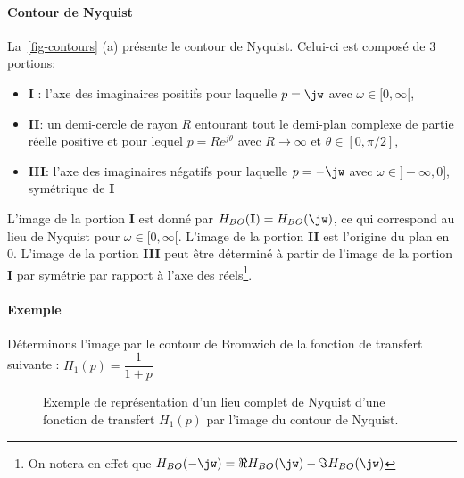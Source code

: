 \paragraph{Contour de Nyquist}
La~\cref{fig-contours} (a) présente le contour de Nyquist. Celui-ci est 
composé de 3 portions:
\begin{itemize}
    \item \textbf{I} : l'axe des imaginaires positifs pour laquelle $p=\jw$ 
          avec $\omega\in[0,\infty[$,
    \item \textbf{II}: un demi-cercle de rayon $R$ entourant tout le 
          demi-plan complexe de partie réelle positive et pour lequel 
          $p=Re^{j\theta}$ avec $R\rightarrow\infty$ et $\theta\in[0,\pi/2]$,
    \item \textbf{III}: l'axe des imaginaires négatifs  pour laquelle $p=-\jw$ 
          avec $\omega\in]-\infty,0]$, symétrique de \textbf{I}
\end{itemize}
L'image de la portion \textbf{I} est donné par 
$H_{BO}(\boldsymbol{\mathrm{I}})=H_{BO}(\jw)$, ce qui correspond au lieu de 
Nyquist pour $\omega\in[0,\infty[$. L'image de la portion \textbf{II} est 
l'origine du plan en 0. L'image de la portion \textbf{III} peut être 
déterminé à partir de l'image de la portion \textbf{I} par symétrie par 
rapport à l'axe des réels\footnote{On notera en effet que 
$H_{BO}(-\jw)=\Re{H_{BO}(\jw)}-\Im{H_{BO}(\jw)}$}.

\paragraph{Exemple}

Déterminons l'image par le contour de Bromwich de la fonction de transfert 
suivante : $H_1(p)=\dfrac{1}{1+p}$
\begin{figure}[!h]
    \centering
    
    \caption{Exemple de représentation d'un lieu complet de Nyquist d'une 
             fonction de transfert $H_1(p)$ par l'image du contour de 
             Nyquist. \label{fig-nyquist_complet_contour}}
\end{figure}
